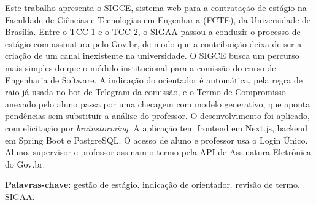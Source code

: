 \begin{resumo}
Este trabalho apresenta o SIGCE, sistema web para a contratação de estágio na Faculdade de Ciências e Tecnologias em Engenharia (FCTE), da Universidade de Brasília. Entre o TCC 1 e o TCC 2, o SIGAA passou a conduzir o processo de estágio com assinatura pelo Gov.br, de modo que a contribuição deixa de ser a criação de um canal inexistente na universidade. O SIGCE busca um percurso mais simples do que o módulo institucional para a comissão do curso de Engenharia de Software. A indicação do orientador é automática, pela regra de raio já usada no bot de Telegram da comissão, e o Termo de Compromisso anexado pelo aluno passa por uma checagem com modelo generativo, que aponta pendências sem substituir a análise do professor. O desenvolvimento foi aplicado, com elicitação por \textit{brainstorming}. A aplicação tem frontend em Next.js, backend em Spring Boot e PostgreSQL. O acesso de aluno e professor usa o Login Único. Aluno, supervisor e professor assinam o termo pela API de Assinatura Eletrônica do Gov.br.

 \vspace{\onelineskip}
    
 \noindent
 \textbf{Palavras-chave}: gestão de estágio. indicação de orientador. revisão de termo. SIGAA.
\end{resumo}
